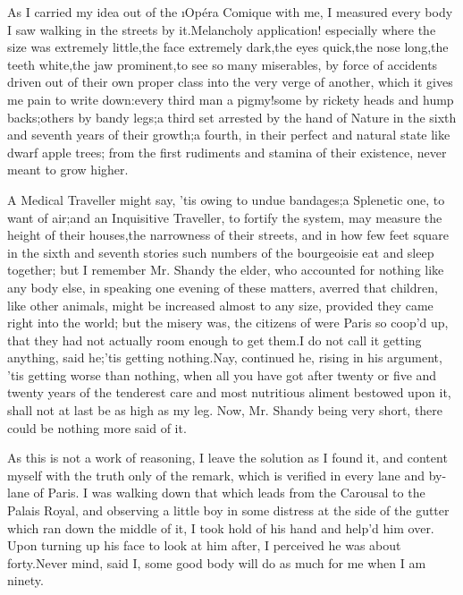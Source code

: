 \documentclass[twoside]{article}
\begin{document}
As I carried my idea out of the \i{Opéra Comique} with me, I measured every
body I saw walking in the streets by it.\tsk Melancholy application!
especially where the size was extremely little,\tsk the face extremely
dark,\tsk the eyes quick,\tsk the nose long,\tsk the teeth white,\tsk the jaw
prominent,\tsk to see so many miserables, by force of accidents driven out of
their own proper class into the very verge of another, which it gives me
pain to write down:\tsk every third man a pigmy!\tsk some by rickety heads and
hump backs;\tsk others by bandy legs;\tsk a third set arrested by the hand of
Nature in the sixth and seventh years of their growth;\tsk a fourth, in their
perfect and natural state like dwarf apple trees; from the first
rudiments and stamina of their existence, never meant to grow higher.

A Medical Traveller might say, ’tis owing to undue bandages;\tsk a Splenetic
one, to want of air;\tsk and an Inquisitive Traveller, to fortify the system,
may measure the height of their houses,\tsk the narrowness of their streets,
and in how few feet square in the sixth and seventh stories such numbers
of the bourgeoisie eat and sleep together; but I remember Mr. Shandy the
elder, who accounted for nothing like any body else, in speaking one
evening of these matters, averred that children, like other animals,
might be increased almost to any size, provided they came right into the
world; but the misery was, the citizens of were Paris so coop’d up, that
they had not actually room enough to get them.\tsk I do not call it getting
anything, said he;\tsk ’tis getting nothing.\tsk Nay, continued he, rising in his
argument, ’tis getting worse than nothing, when all you have got after
twenty or five and twenty years of the tenderest care and most nutritious
aliment bestowed upon it, shall not at last be as high as my leg.  Now,
Mr. Shandy being very short, there could be nothing more said of it.

As this is not a work of reasoning, I leave the solution as I found it,
and content myself with the truth only of the remark, which is verified
in every lane and by-lane of Paris.  I was walking down that which leads
from the Carousal to the Palais Royal, and observing a little boy in some
distress at the side of the gutter which ran down the middle of it, I
took hold of his hand and help’d him over.  Upon turning up his face to
look at him after, I perceived he was about forty.\tsk Never mind, said I,
some good body will do as much for me when I am ninety.
\end{document}
